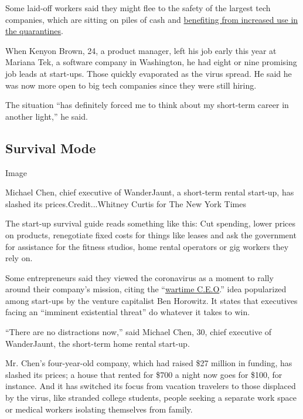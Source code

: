 Some laid-off workers said they might flee to the safety of the largest
tech companies, which are sitting on piles of cash and
\href{https://www.nytimes3xbfgragh.onion/2020/03/23/technology/coronavirus-facebook-amazon-youtube.html}{benefiting
from increased use in the quarantines}.

When Kenyon Brown, 24, a product manager, left his job early this year
at Mariana Tek, a software company in Washington, he had eight or nine
promising job leads at start-ups. Those quickly evaporated as the virus
spread. He said he was now more open to big tech companies since they
were still hiring.

The situation ``has definitely forced me to think about my short-term
career in another light,'' he said.

\hypertarget{survival-mode}{%
\subsection{Survival Mode}\label{survival-mode}}

Image

Michael Chen, chief executive of WanderJaunt, a short-term rental
start-up, has slashed its prices.Credit...Whitney Curtis for The New
York Times

The start-up survival guide reads something like this: Cut spending,
lower prices on products, renegotiate fixed costs for things like leases
and ask the government for assistance for the fitness studios, home
rental operators or gig workers they rely on.

Some entrepreneurs said they viewed the coronavirus as a moment to rally
around their company's mission, citing the
``\href{https://a16z.com/2011/04/14/peacetime-ceowartime-ceo-2/}{wartime
C.E.O}.'' idea popularized among start-ups by the venture capitalist Ben
Horowitz. It states that executives facing an ``imminent existential
threat'' do whatever it takes to win.

``There are no distractions now,'' said Michael Chen, 30, chief
executive of WanderJaunt, the short-term home rental start-up.

Mr. Chen's four-year-old company, which had raised \$27 million in
funding, has slashed its prices; a house that rented for \$700 a night
now goes for \$100, for instance. And it has switched its focus from
vacation travelers to those displaced by the virus, like stranded
college students, people seeking a separate work space or medical
workers isolating themselves from family.

